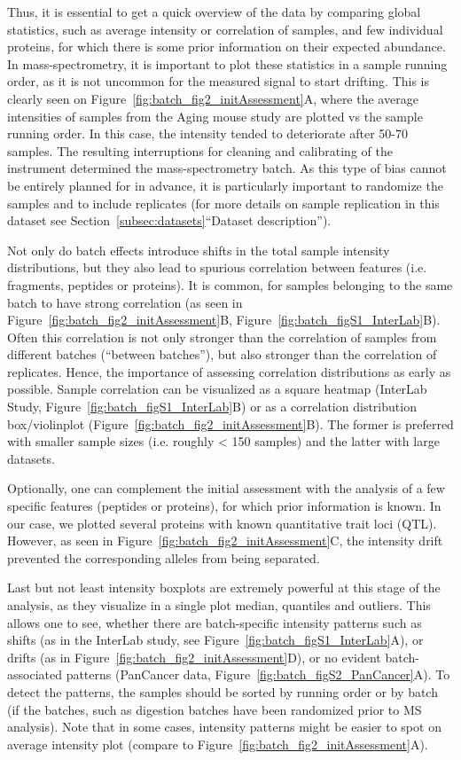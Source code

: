 \documentclass[num-refs]{wiley-article}
\begin{document}
Thus, it is essential to get a quick overview of the data by comparing global statistics, such as average intensity or correlation of samples, and few individual proteins, for which there is some prior information on their expected abundance. In mass-spectrometry, it is important to plot these statistics in a sample running order, as it is not uncommon for the measured signal to start drifting. This is clearly seen on Figure~\ref{fig:batch_fig2_initAssessment}A, where the average intensities of samples from the Aging mouse study are plotted vs the sample running order. In this case, the intensity tended to deteriorate after 50-70 samples. The resulting interruptions for cleaning and calibrating of the instrument determined the mass-spectrometry batch. As this type of bias cannot be entirely planned for in advance, it is particularly important to randomize the samples and to include replicates (for more details on sample replication in this dataset see Section~\ref{subsec:datasets}“Dataset description”). 

Not only do batch effects introduce shifts in the total sample intensity distributions, but they also lead to spurious correlation between features (i.e. fragments, peptides or proteins). It is common, for samples belonging to the same batch to have strong correlation (as seen in Figure~\ref{fig:batch_fig2_initAssessment}B, Figure~\ref{fig:batch_figS1_InterLab}B). Often this correlation is not only stronger than the correlation of samples from different batches (“between batches”), but also stronger than the correlation of replicates. Hence, the importance of assessing correlation distributions as early as possible. Sample correlation can be visualized as a square heatmap (InterLab Study, Figure~\ref{fig:batch_figS1_InterLab}B) or as a correlation distribution box/violinplot (Figure~\ref{fig:batch_fig2_initAssessment}B). The former is preferred with smaller sample sizes (i.e. roughly < 150 samples) and the latter with large datasets.

Optionally, one can complement the initial assessment with the analysis of a few specific features (peptides or proteins), for which prior information is known. In our case, we plotted several proteins with known quantitative trait loci (QTL). However, as seen in Figure~\ref{fig:batch_fig2_initAssessment}C, the intensity drift prevented the corresponding alleles from being separated.

Last but not least intensity boxplots are extremely powerful at this stage of the analysis, as they visualize in a single plot median, quantiles and outliers. This allows one to see, whether there are batch-specific intensity patterns such as shifts (as in the InterLab study, see Figure~\ref{fig:batch_figS1_InterLab}A), or drifts (as in Figure~\ref{fig:batch_fig2_initAssessment}D), or no evident batch-associated patterns (PanCancer data, Figure~\ref{fig:batch_figS2_PanCancer}A). To detect the patterns, the samples should be sorted by running order or by batch (if the batches, such as digestion batches have been randomized prior to MS analysis). Note that in some cases, intensity patterns might be easier to spot on average intensity plot (compare to Figure~\ref{fig:batch_fig2_initAssessment}A).
\end{document}
